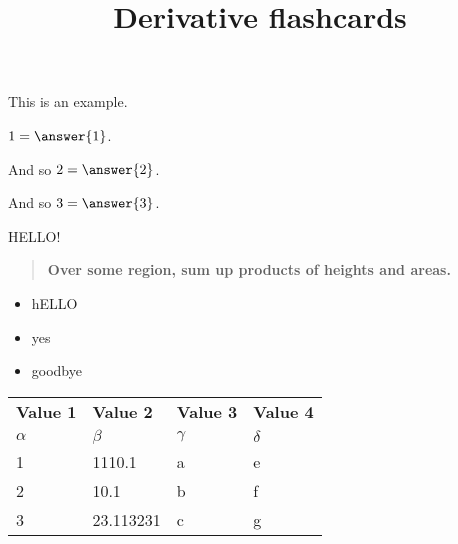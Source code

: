 \documentclass{ximera}
\title{Derivative flashcards}
\begin{document}
\begin{example}
  This is an example.

  $1 = \answer{1}$.
  
  \begin{problem}
    And so $2 = \answer{2}$.
  \end{problem}

  \begin{problem}
    And so $3 = \answer{3}$.
  \end{problem}
  
  \begin{hint}
    HELLO!
  \end{hint}  
\end{example}

\begin{quote}
\textbf{Over \textcolor{red!50!black}{some region},
\textcolor{green!70!black!70!blue}{sum up} products of
\textcolor{purple!50!blue!90!black}{heights} and \textcolor{blue!70!green}{areas}.}
\end{quote}


\begin{itemize}
\item hELLO
\item yes
\item goodbye
\end{itemize}

    \begin{tabular}{llll}
      \textbf{Value 1} & \textbf{Value 2} & \textbf{Value 3} & \textbf{Value 4}\\ %
      $\alpha$ & $\beta$ & $\gamma$ & $\delta$ \\ %
      \hline
      1 & 1110.1 & a & e\\ 
      2 & 10.1 & b & f\\ 
      3 & 23.113231 & c & g\\ 
    \end{tabular}
    
\end{document}
